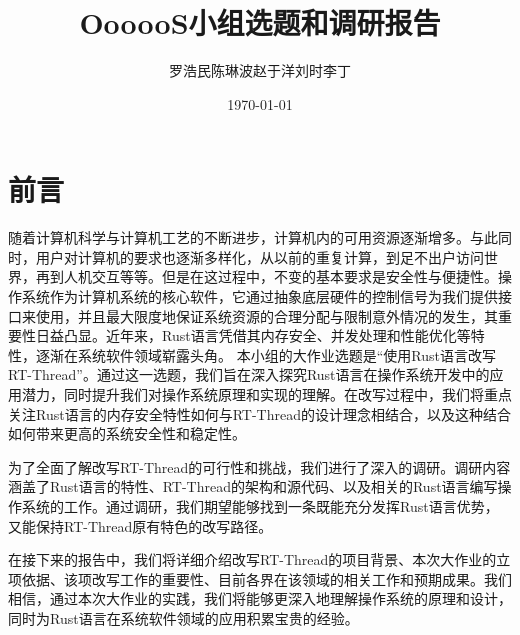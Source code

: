 \documentclass{ctexart}
\title{OooooS小组选题和调研报告}
\author{罗浩民\;陈琳波\;赵于洋\;刘时\;李丁}
\date{\today}
\begin{document}
\maketitle

\section{前言}
随着计算机科学与计算机工艺的不断进步，计算机内的可用资源逐渐增多。与此同时，用户对计算机的要求也逐渐多样化，从以前的重复计算，到足不出户访问世界，再到人机交互等等。但是在这过程中，不变的基本要求是安全性与便捷性。操作系统作为计算机系统的核心软件，它通过抽象底层硬件的控制信号为我们提供接口来使用，并且最大限度地保证系统资源的合理分配与限制意外情况的发生，其重要性日益凸显。近年来，Rust语言凭借其内存安全、并发处理和性能优化等特性，逐渐在系统软件领域崭露头角。
本小组的大作业选题是“使用Rust语言改写RT-Thread”。通过这一选题，我们旨在深入探究Rust语言在操作系统开发中的应用潜力，同时提升我们对操作系统原理和实现的理解。在改写过程中，我们将重点关注Rust语言的内存安全特性如何与RT-Thread的设计理念相结合，以及这种结合如何带来更高的系统安全性和稳定性。

为了全面了解改写RT-Thread的可行性和挑战，我们进行了深入的调研。调研内容涵盖了Rust语言的特性、RT-Thread的架构和源代码、以及相关的Rust语言编写操作系统的工作。通过调研，我们期望能够找到一条既能充分发挥Rust语言优势，又能保持RT-Thread原有特色的改写路径。

在接下来的报告中，我们将详细介绍改写RT-Thread的项目背景、本次大作业的立项依据、该项改写工作的重要性、目前各界在该领域的相关工作和预期成果。我们相信，通过本次大作业的实践，我们将能够更深入地理解操作系统的原理和设计，同时为Rust语言在系统软件领域的应用积累宝贵的经验。
\newpage
\tableofcontents
\newpage







\end{document}
